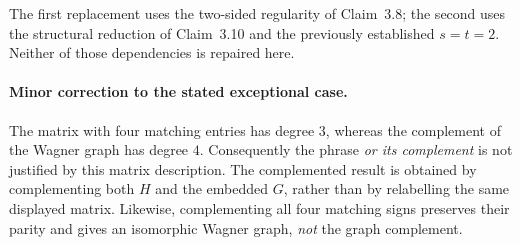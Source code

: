 \documentclass[11pt]{article}
\begin{document}
The first replacement uses the two-sided regularity of
Claim~3.8; the second uses the structural reduction of Claim~3.10
and the previously established \(s=t=2\). Neither of those
dependencies is repaired here.

\paragraph{Minor correction to the stated exceptional case.}
The matrix with four matching entries has degree \(3\), whereas
the complement of the Wagner graph has degree \(4\). Consequently
the phrase \emph{or its complement} is not justified by this
matrix description. The complemented result is obtained by
complementing both \(H\) and the embedded \(G\), rather than
by relabelling the same displayed matrix. Likewise,
complementing all four matching signs preserves their parity
and gives an isomorphic Wagner graph, \emph{not} the graph
complement.
\end{document}
